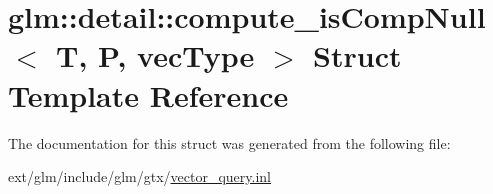 \hypertarget{structglm_1_1detail_1_1compute__is_comp_null}{\section{glm\-:\-:detail\-:\-:compute\-\_\-is\-Comp\-Null$<$ T, P, vec\-Type $>$ Struct Template Reference}
\label{structglm_1_1detail_1_1compute__is_comp_null}
}


The documentation for this struct was generated from the following file\-:\begin{DoxyCompactItemize}
\item 
ext/glm/include/glm/gtx/\hyperlink{vector__query_8inl}{vector\-\_\-query.\-inl}\end{DoxyCompactItemize}
